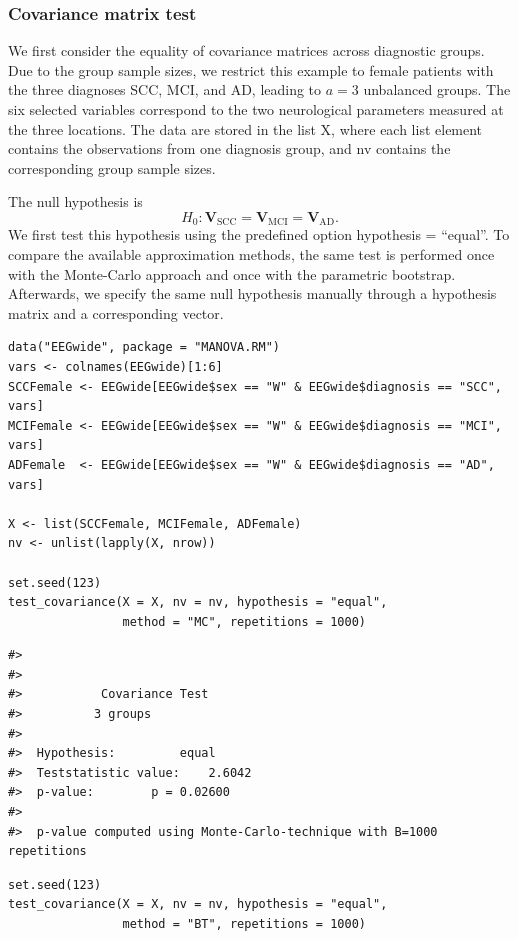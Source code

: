 \subsubsection{Covariance matrix test}\label{covariance-matrix-test}

We first consider the equality of covariance matrices across diagnostic groups.
Due to the group sample sizes, we restrict this example to female patients with
the three diagnoses SCC, MCI, and AD, leading to \(a = 3\) unbalanced groups.
The six selected variables correspond to the two neurological parameters
measured at the three locations. The data are stored in the list X, where
each list element contains the observations from one diagnosis group, and nv
contains the corresponding group sample sizes.

The null hypothesis is
\begin{equation}
H_0:\boldsymbol{V}_{\mathrm{SCC}}
=\boldsymbol{V}_{\mathrm{MCI}}
=\boldsymbol{V}_{\mathrm{AD}}.
\label{eq:eeg-cov-hypothesis}
\end{equation}
We first test this hypothesis using the predefined option
hypothesis = ``equal''. To compare the available approximation methods, the
same test is performed once with the Monte-Carlo approach and once with the
parametric bootstrap. Afterwards, we specify the same null hypothesis manually
through a hypothesis matrix and a corresponding vector.

\begin{verbatim}
data("EEGwide", package = "MANOVA.RM")
vars <- colnames(EEGwide)[1:6]
SCCFemale <- EEGwide[EEGwide$sex == "W" & EEGwide$diagnosis == "SCC", vars]
MCIFemale <- EEGwide[EEGwide$sex == "W" & EEGwide$diagnosis == "MCI", vars]
ADFemale  <- EEGwide[EEGwide$sex == "W" & EEGwide$diagnosis == "AD", vars]

X <- list(SCCFemale, MCIFemale, ADFemale)
nv <- unlist(lapply(X, nrow))

set.seed(123)
test_covariance(X = X, nv = nv, hypothesis = "equal",
                method = "MC", repetitions = 1000)
\end{verbatim}

\begin{verbatim}
#> 
#> 
#>           Covariance Test 
#>          3 groups
#> 
#>  Hypothesis:         equal
#>  Teststatistic value:    2.6042
#>  p-value:        p = 0.02600
#>  
#>  p-value computed using Monte-Carlo-technique with B=1000 repetitions
\end{verbatim}

\begin{verbatim}
set.seed(123)
test_covariance(X = X, nv = nv, hypothesis = "equal",
                method = "BT", repetitions = 1000)
\end{verbatim}

